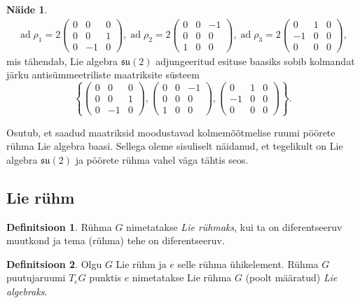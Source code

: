 \documentclass[12pt,a4paper,oneside]{article}
\theoremstyle{plain}
\theoremstyle{definition}
\newtheorem{definitsioon}{Definitsioon}[section]
\newtheorem{naide}{Näide}[section]
\numberwithin{equation}{section}
\def\su2{{\mathfrak{ su}\left(2\right)}}
\DeclareMathOperator{\ad}{ad}
\begin{document}
\begin{naide}
\begin{align*}
\ad \rho_1 = 2\begin{pmatrix}
0 & 0 & 0 \\
0 & 0 & 1 \\
0 & -1 & 0
\end{pmatrix}, 
\ad \rho_2 = 2\begin{pmatrix}
0 & 0 & -1 \\
0 & 0 & 0 \\
1 & 0 & 0
\end{pmatrix}, 
\ad \rho_3 = 2\begin{pmatrix}
0 & 1 & 0 \\
-1 & 0 & 0 \\
0 & 0 & 0
\end{pmatrix},
\end{align*}
mis tähendab, Lie algebra $\su2$ adjungeeritud esituse baasiks sobib 
kolmandat järku antisümmeetriliste maatriksite süsteem 
\[\left\lbrace \begin{pmatrix}
0 & 0 & 0 \\
0 & 0 & 1 \\
0 & -1 & 0
\end{pmatrix}, \begin{pmatrix}
0 & 0 & -1 \\
0 & 0 & 0 \\
1 & 0 & 0
\end{pmatrix}, \begin{pmatrix}
0 & 1 & 0 \\
-1 & 0 & 0 \\
0 & 0 & 0
\end{pmatrix} \right\rbrace.\]
\end{naide}

Osutub, et saadud maatriksid moodustavad kolmemõõtmelise ruumi 
pöörete rühma Lie algebra baasi. Sellega oleme sisuliselt näidanud, 
et tegelikult on Lie algebra $\su2$ ja pöörete rühma vahel väga 
tähtis seos.

\subsection{Lie rühm} \label{ptk:lie_ryhm}

\begin{definitsioon}
Rühma $G$ nimetatakse \emph{Lie rühmaks}, kui ta on diferentseeruv 
muutkond ja tema (rühma) tehe on diferentseeruv.
\end{definitsioon}

\begin{definitsioon}
Olgu $G$ Lie rühm ja $e$ selle rühma ühikelement. Rühma $G$ 
puutujaruumi $T_e G$ punktis $e$ nimetatakse Lie rühma $G$ (poolt 
määratud) \emph{Lie algebraks}.
\end{definitsioon}
\end{document}
